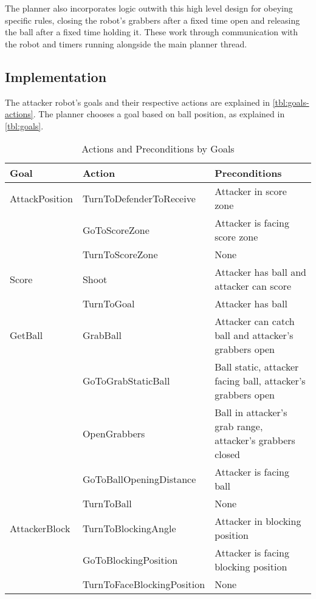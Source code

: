 The planner also incorporates logic outwith this high level design for obeying specific rules, closing the robot's grabbers after a fixed time open and releasing the ball after a fixed time holding it. These work through communication with the robot and timers running alongside the main planner thread.

\subsection{Implementation}

The attacker robot's goals and their respective actions are explained in \autoref{tbl:goals-actions}.
The planner chooses a goal based on ball position, as explained in \autoref{tbl:goals}.

\begin{table}[H]
  \centering
\begin{tabularx}{\textwidth}{l l X}
\toprule
\textbf{Goal} & \textbf{Action} & \textbf{Preconditions} \\ 
\midrule

AttackPosition & TurnToDefenderToReceive & Attacker in score zone \\ 
&GoToScoreZone & Attacker is facing score zone  \\ 
&TurnToScoreZone & None \\
\midrule

Score & Shoot & Attacker has ball and attacker can score \\ 
& TurnToGoal & Attacker has ball \\ 
\midrule

GetBall & GrabBall & Attacker can catch ball and attacker's grabbers open \\ 
& GoToGrabStaticBall & Ball static, attacker facing ball, attacker's grabbers open \\ &OpenGrabbers & Ball in attacker's grab range, attacker's grabbers closed \\ 
&GoToBallOpeningDistance & Attacker is facing ball \\
&TurnToBall & None \\ 
\midrule

AttackerBlock & TurnToBlockingAngle & Attacker in blocking position \\ 
& GoToBlockingPosition & Attacker is facing blocking position \\ 
& TurnToFaceBlockingPosition & None \\ 
\bottomrule
\end{tabularx}
\caption{Actions and Preconditions by Goals}
\label{tbl:goals-actions}
\end{table}


